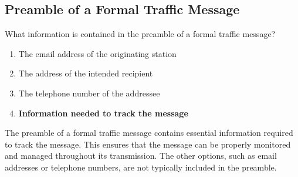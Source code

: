 \subsection{Preamble of a Formal Traffic Message}
\label{T2C10}

\begin{tcolorbox}[colback=gray!10!white,colframe=black!75!black,title=T2C10]
What information is contained in the preamble of a formal traffic message?
\begin{enumerate}[noitemsep]
    \item The email address of the originating station
    \item The address of the intended recipient
    \item The telephone number of the addressee
    \item \textbf{Information needed to track the message}
\end{enumerate}
\end{tcolorbox}

The preamble of a formal traffic message contains essential information required to track the message. This ensures that the message can be properly monitored and managed throughout its transmission. The other options, such as email addresses or telephone numbers, are not typically included in the preamble.
